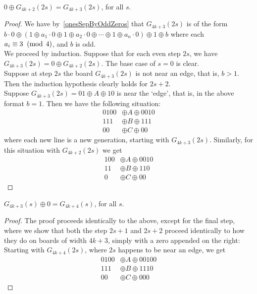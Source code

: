 \documentclass[12pt,letterpaper]{article}
\begin{document}
\addtocounter{prop}{1}
\begin{innerProp}\label{2mod4everyotherwith0}
  $0\oplus G_{4k+2}(2s)=G_{4k+3}(2s)$, for all $s$.
\end{innerProp}
\begin{proof}
  We have {{{ by~\cref{onesSepByOddZeros} }}} that $G_{4k+3}(2s)$ is of the form $b\cdot 0 \oplus (1 \oplus a_1\cdot 0 \oplus 1\oplus a_2\cdot 0\oplus\cdots \oplus 1\oplus a_n\cdot 0) \oplus 1 \oplus b$ where each $a_i\equiv 3 \;\;(\operatorname{mod}\;4)$, and $b$ is odd. \\
  We proceed by induction. Suppose that for each even step $2s$, we have $G_{4k+3}(2s)=0\oplus G_{4k+2}(2s)$. The base case of $s=0$ is clear. \\
  Suppose at step $2s$ the board $G_{4k+3}(2s)$ is not near an edge, that is, $b>1$. Then the induction hypothesis clearly holds for $2s+2$. \\
  Suppose $G_{4k+3}(2s)=01\oplus A\oplus 10$ is near the `edge', that is, in the above format $b=1$. Then we have the following situation:
  \begin{align*}
    0100&\oplus A \oplus 0010 \\
    111&\oplus B \oplus 111 \\
    00&\oplus C \oplus 00
  \end{align*}
  where each new line is a new generation, starting with $G_{4k+3}(2s)$. Similarly, for this situation with $G_{4k+2}(2s)$ we get
  \begin{align*}
    100 &\oplus A\oplus 0010 \\
    11 &\oplus B\oplus 110 \\
    0 &\oplus C\oplus 00
  \end{align*}
\end{proof}
\begin{innerProp}\label{3mod4With0is4mod4}
  $G_{4k+3}(s)\oplus 0=G_{4k+4}(s)$, for all $s$.
\end{innerProp}
\begin{proof}
  The proof proceeds identically to the above, except for the final step, where we show that both the step $2s+1$ and $2s+2$ proceed identically to how they do on boards of width $4k+3$, simply with a zero appended on the right: \\
  Starting with $G_{4k+4}(2s)$, where $2s$ happens to be near an edge, we get
  \begin{align*}
    0100&\oplus A \oplus 00100 \\
    111&\oplus B \oplus 1110 \\
    00&\oplus C \oplus 000 
  \end{align*}
\end{proof}
\end{document}
